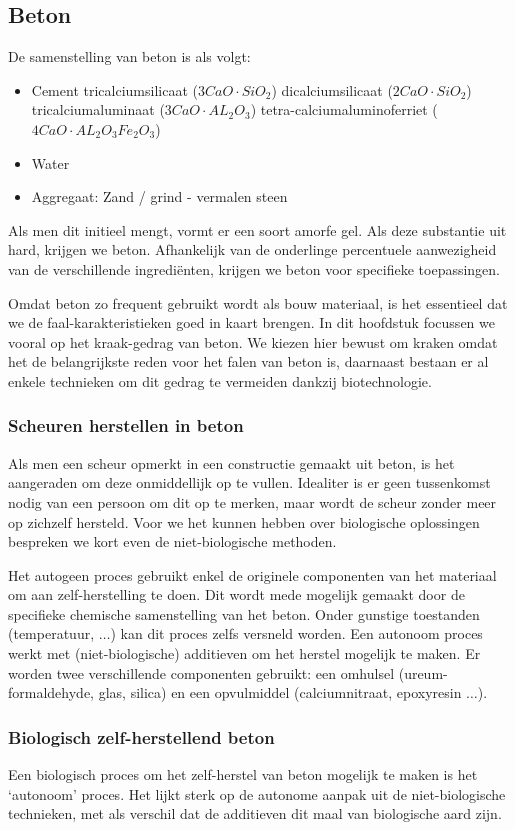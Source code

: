 \documentclass[a4paper,kul]{kulakarticle} %
\begin{document}
\subsection{Beton}
De samenstelling van beton is als volgt:
\begin{itemize}
	\item Cement
	\subitem tricalciumsilicaat ($3CaO\cdot SiO_2$)
	\subitem dicalciumsilicaat ($2CaO\cdot SiO_2$)
	\subitem tricalciumaluminaat ($3CaO\cdot AL_2O_3$)
	\subitem tetra-calciumaluminoferriet ($4CaO\cdot AL_2O_3Fe_2O_3$)
	\item Water
	\item Aggregaat: Zand / grind - vermalen steen
\end{itemize}
Als men dit initieel mengt, vormt er een soort amorfe gel. Als deze substantie uit hard, krijgen we beton. Afhankelijk van de onderlinge percentuele aanwezigheid van de verschillende ingrediënten, krijgen we beton voor specifieke toepassingen. 

Omdat beton zo frequent gebruikt wordt als bouw materiaal, is het essentieel dat we de faal-karakteristieken goed in kaart brengen. In dit hoofdstuk focussen we vooral op het kraak-gedrag van beton. We kiezen hier bewust om kraken omdat het de belangrijkste reden voor het falen van beton is, daarnaast bestaan er al enkele technieken om dit gedrag te vermeiden dankzij biotechnologie. 
\subsubsection{Scheuren herstellen in beton}
Als men een scheur opmerkt in een constructie gemaakt uit beton, is het aangeraden om deze onmiddellijk op te vullen. Idealiter is er geen tussenkomst nodig van een persoon om dit op te merken, maar wordt de scheur zonder meer op zichzelf hersteld. Voor we het kunnen hebben over biologische oplossingen bespreken we kort even de niet-biologische methoden.

Het autogeen proces gebruikt enkel de originele componenten van het materiaal om aan zelf-herstelling te doen. Dit wordt mede mogelijk gemaakt door de specifieke chemische samenstelling van het beton. Onder gunstige toestanden (temperatuur, $\ldots$) kan dit proces zelfs versneld worden. Een autonoom proces werkt met (niet-biologische) additieven om het herstel mogelijk te maken. Er worden twee verschillende componenten gebruikt: een omhulsel (ureum-formaldehyde, glas, silica) en een opvulmiddel (calciumnitraat, epoxyresin $\ldots$).
\subsubsection{Biologisch zelf-herstellend beton}
Een biologisch proces om het zelf-herstel van beton mogelijk te maken is het `autonoom' proces. Het lijkt sterk op de autonome aanpak uit de niet-biologische technieken, met als verschil dat de additieven dit maal van biologische aard zijn. \\
\end{document}
